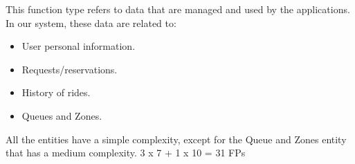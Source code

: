 This function type refers to data that are managed and used by the applications. 
\newline
In our system, these data are related to:
\begin{itemize}
    \item User personal information. 
    \item Requests/reservations. 
    \item History of rides. 
    \item Queues and Zones. 
\end{itemize}
All the entities have a simple complexity, except for the Queue and Zones entity that has a medium complexity. 3 x 7 + 1 x 10 = 31 FPs
